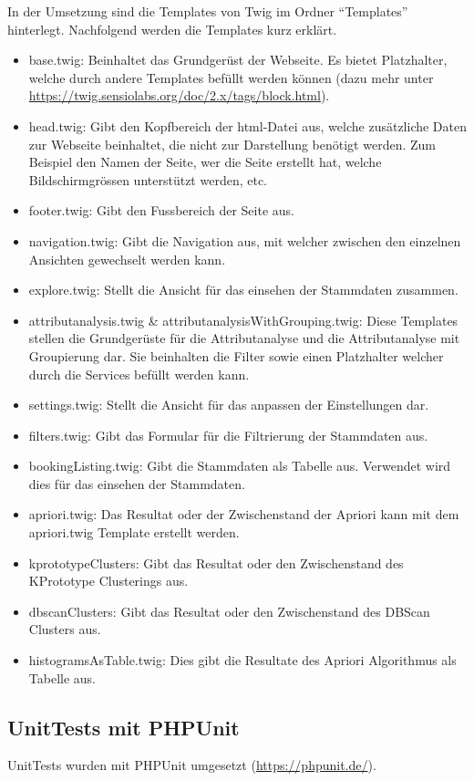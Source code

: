 In der Umsetzung sind die Templates von Twig im Ordner "`Templates"' hinterlegt. Nachfolgend werden die Templates kurz erklärt.
\begin{itemize}
	\item base.twig: Beinhaltet das Grundgerüst der Webseite. Es bietet Platzhalter, welche durch andere Templates befüllt werden können (dazu mehr unter \url{https://twig.sensiolabs.org/doc/2.x/tags/block.html}).
	\item head.twig: Gibt den Kopfbereich der \gls{html}-Datei aus, welche zusätzliche Daten zur Webseite beinhaltet, die nicht zur Darstellung benötigt werden. Zum Beispiel den Namen der Seite, wer die Seite erstellt hat, welche Bildschirmgrössen unterstützt werden, etc.
	\item footer.twig: Gibt den Fussbereich der Seite aus. 
	\item navigation.twig: Gibt die Navigation aus, mit welcher zwischen den einzelnen Ansichten gewechselt werden kann.
	\item explore.twig: Stellt die Ansicht für das einsehen der Stammdaten zusammen. 
	\item attributanalysis.twig \& attributanalysisWithGrouping.twig: Diese Templates stellen die Grundgerüste für die Attributanalyse und die Attributanalyse mit Groupierung dar. Sie beinhalten die Filter sowie einen Platzhalter welcher durch die Services befüllt werden kann.
	\item settings.twig: Stellt die Ansicht für das anpassen der Einstellungen dar. 
	\item filters.twig: Gibt das Formular für die Filtrierung der Stammdaten aus.
	\item bookingListing.twig: Gibt die Stammdaten als Tabelle aus. Verwendet wird dies für das einsehen der Stammdaten.
	\item apriori.twig: Das Resultat oder der Zwischenstand der Apriori kann mit dem apriori.twig Template erstellt werden.
	\item kprototypeClusters: Gibt das Resultat oder den Zwischenstand des KPrototype Clusterings aus.
	\item dbscanClusters: Gibt das Resultat oder den Zwischenstand des DBScan Clusters aus.
	\item histogramsAsTable.twig: Dies gibt die Resultate des Apriori Algorithmus als Tabelle aus. 
\end{itemize}

\subsection{UnitTests mit PHPUnit}
\label{sec:proofofconcept:externebibliotheken:phpunit}
UnitTests wurden mit PHPUnit umgesetzt (\url{https://phpunit.de/}).

